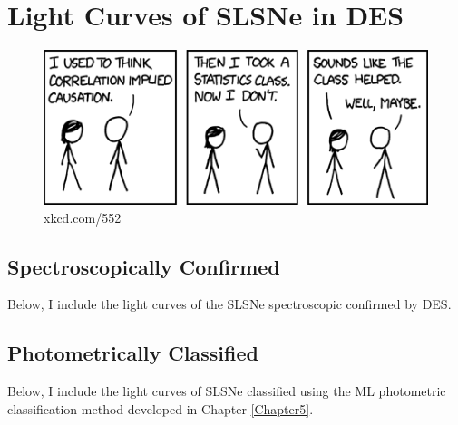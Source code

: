 \chapter{Light Curves of SLSNe in DES}
\label{AppendixA}

\begin{figure}[H]
  \centering
  \includegraphics[width=\textwidth]{Figures/xkcd/appendix.png}
  \caption*{xkcd.com/552}
\end{figure}

\section{Spectroscopically Confirmed}
Below, I include the light curves of the SLSNe spectroscopic confirmed by DES.

\section{Photometrically Classified}
Below, I include the light curves of SLSNe classified using the ML photometric classification method developed in Chapter \ref{Chapter5}.
